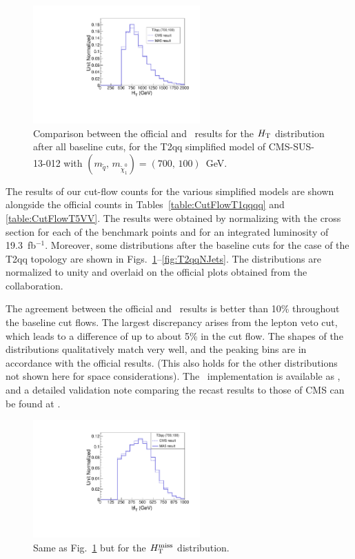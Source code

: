 \begin{figure}[!b]
\centering
\includegraphics[width=6.4cm]{figures/madanalysis5/cms-012-T2qqHT.pdf}
\caption{Comparison between the official and \ma\ results  for the $H_{\rm T}$ distribution after all baseline cuts, 
for the T2qq simplified model of CMS-SUS-13-012 with $(m_{\tilde q},\,m_{\tilde\chi^0_1})=(700,\,100)$~GeV.}
\label{fig:T2qqHT}
\end{figure}

The results of our cut-flow counts for the various simplified models are shown alongside the official counts in 
Tables~\ref{table:CutFlowT1qqqq}  and \ref{table:CutFlowT5VV}. The results 
were obtained by normalizing with the cross section for each 
of the benchmark points and for an integrated luminosity of 19.3~fb$^{-1}$.
Moreover, some distributions after the baseline cuts for the case of the T2qq topology 
are shown in Figs.~\ref{fig:T2qqHT}--\ref{fig:T2qqNJets}. 
The distributions are normalized to unity and overlaid on the official plots obtained from the collaboration.



The agreement between the official and \ma\ results is better than 10\% throughout the baseline cut flows. The largest discrepancy arises from the lepton veto cut, which leads to a difference of up to about 5\% in the cut flow. The shapes of the distributions qualitatively match very well, and the peaking bins are in accordance with the official results. (This also holds for the other distributions not shown here for space considerations). 
The \ma\ implementation is available as \cite{MA5-CMS-SUS-13-012}, and 
a detailed validation note comparing the recast results to those of CMS can be found at \cite{ma5wiki}. 


\begin{figure}
\centering
\includegraphics[width=6.4cm]{figures/madanalysis5/cms-012-T2qqMHT.pdf}
\caption{Same as Fig.~\ref{fig:T2qqHT} but for the $H_{\text{T}}^{\rm miss}$ distribution.}
\label{fig:T2qqMHT}
\end{figure}


